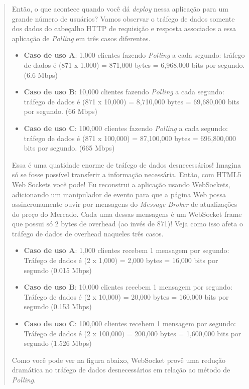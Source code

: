 \documentclass[a4paper,12pt]{article}
\begin{document}
\begin{quotation}
Então, o que acontece quando você dá \emph{deploy} nessa aplicação para um grande número de usuários? Vamos observar o tráfego de dados somente dos dados do cabeçalho HTTP de requisição e resposta associados a essa aplicação de \emph{Polling} em três casos diferentes.

\begin{itemize}
    \item \textbf{Caso de uso A}: 1,000 clientes fazendo \emph{Polling} a cada segundo: tráfego de dados é (871 x 1,000) = 871,000 bytes = 6,968,000 bits por segundo. (6.6 Mbps)
    \item \textbf{Caso de uso B}: 10,000 clientes fazendo \emph{Polling} a cada segundo: tráfego de dados é (871 x 10,000) = 8,710,000 bytes = 69,680,000 bits por segundo. (66 Mbps)
    \item \textbf{Caso de uso C}: 100,000 clientes fazendo \emph{Polling} a cada segundo: tráfego de dados é (871 x 100,000) = 87,100,000 bytes = 696,800,000 bits por segundo. (665 Mbps)
\end{itemize}

Essa é uma quatidade enorme de tráfego de dados desnecessários! Imagina só se fosse possível transferir a informação necessária. Então, com HTML5 Web Sockets você pode! Eu reconstrui a aplicação usando WebSockets, adicionando um manipulador de evento para que a página Web possa assincronamente ouvir por mensagens do \emph{Message Broker} de atualizações do preço do Mercado. Cada uma dessas mensagens é um WebSocket frame que possui só 2 bytes de overhead (ao invés de 871)! Veja como isso afeta o tráfego de dados de overhead naqueles três casos.

\begin{itemize}
    \item \textbf{Caso de uso A}: 1,000 clientes recebem 1 mensagem por segundo: Tráfego de dados é (2 x 1,000) = 2,000 bytes = 16,000 bits por segundo (0.015 Mbps)
    \item \textbf{Caso de uso B}: 10,000 clientes recebem 1 mensagem por segundo: Tráfego de dados é (2 x 10,000) = 20,000 bytes = 160,000 bits por segundo (0.153 Mbps)
    \item \textbf{Caso de uso C}: 100,000 clientes recebem 1 mensagem por segundo: Tráfego de dados é (2 x 100,000) = 200,000 bytes = 1,600,000 bits por segundo (1.526 Mbps)
\end{itemize}

Como você pode ver na figura abaixo, WebSocket provê uma redução dramática no tráfego de dados desnecessários em relação ao método de \emph{Polling}.


\end{quotation}
\end{document}
